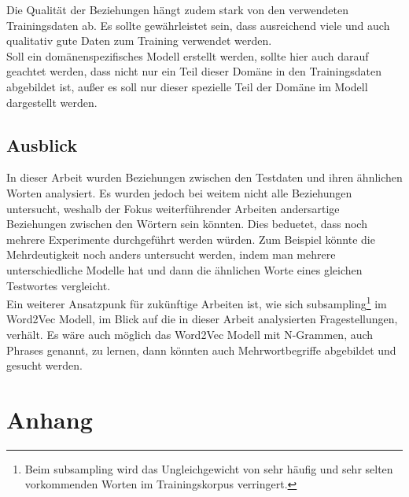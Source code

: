 \documentclass[12pt,a4paper]{report}
\begin{document}
Die Qualität der Beziehungen hängt zudem stark von den verwendeten Trainingsdaten ab. Es sollte gewährleistet sein, dass ausreichend viele und auch qualitativ gute Daten zum Training verwendet werden.\\
Soll ein domänenspezifisches Modell erstellt werden, sollte hier auch darauf geachtet werden, dass nicht nur ein Teil dieser Domäne in den Trainingsdaten abgebildet ist, außer es soll nur dieser spezielle Teil der Domäne im Modell dargestellt werden.\\


\section{Ausblick}

In dieser Arbeit wurden Beziehungen zwischen den Testdaten und ihren ähnlichen Worten analysiert. Es wurden jedoch bei weitem nicht alle Beziehungen untersucht, weshalb der Fokus weiterführender Arbeiten andersartige Beziehungen zwischen den Wörtern sein könnten. Dies beduetet, dass noch mehrere Experimente durchgeführt werden würden. Zum Beispiel könnte die Mehrdeutigkeit noch anders untersucht werden, indem man mehrere unterschiedliche Modelle hat und dann die ähnlichen Worte eines gleichen Testwortes vergleicht.\\

Ein weiterer Ansatzpunk  für zukünftige Arbeiten ist, wie sich subsampling\footnote{Beim subsampling wird das Ungleichgewicht von sehr häufig und sehr selten vorkommenden Worten im Trainingskorpus verringert\citep{DBLP:journals/corr/MikolovSCCD13}. } im Word2Vec Modell, im Blick auf die in dieser Arbeit analysierten Fragestellungen, verhält. Es wäre auch möglich das Word2Vec Modell mit N-Grammen, auch Phrases genannt, zu lernen, dann könnten auch Mehrwortbegriffe abgebildet und gesucht werden.





\newpage


\nocite{DBLP:conf/naacl/MikolovYZ13}

\listoftables
\listoffigures 




\chapter{Anhang}
\end{document}
